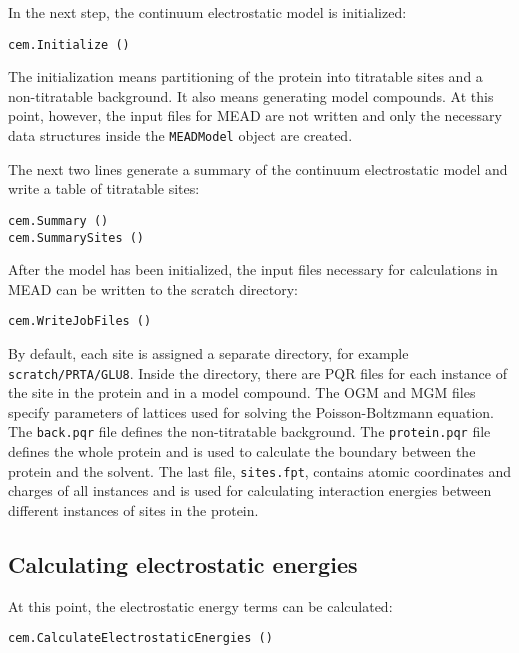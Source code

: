 \documentclass[a4paper,11pt]{article}
\begin{document}
{\bigskip
In the next step, the continuum electrostatic model is initialized:

{\footnotesize \begin{lstlisting}
cem.Initialize ()
\end{lstlisting} }

\bigskip
The initialization means partitioning of the protein into titratable sites and
a non-titratable background.
%
It also means generating model compounds.
%
At this point, however, the input files for MEAD are not written and only
the necessary data structures inside the \texttt{MEADModel} object are created.

\bigskip
The next two lines generate a summary of the continuum electrostatic model and
write a table of titratable sites:

{\footnotesize \begin{lstlisting}
cem.Summary ()
cem.SummarySites ()
\end{lstlisting} }

\bigskip
After the model has been initialized, the input files necessary for calculations in MEAD
can be written to the scratch directory:

{\footnotesize \begin{lstlisting}
cem.WriteJobFiles ()
\end{lstlisting} }

By default, each site is assigned a separate directory, for example
\texttt{scratch/PRTA/GLU8}.
%
Inside the directory, there are PQR files for each instance of the site in the protein
and in a model compound.
%
The OGM and MGM files specify parameters of lattices used for solving the Poisson-Boltzmann equation.
%
The \texttt{back.pqr} file defines the non-titratable background.
%
The \texttt{protein.pqr} file defines the whole protein and is used to calculate the boundary
between the protein and the solvent.
%
The last file, \texttt{sites.fpt}, contains atomic coordinates and charges of all instances
and is used for calculating interaction energies between
different instances of sites in the protein.


\subsection{Calculating electrostatic energies}
At this point, the electrostatic energy terms can be calculated:

{\footnotesize \begin{lstlisting}
cem.CalculateElectrostaticEnergies ()
\end{lstlisting} }

}
\end{document}
